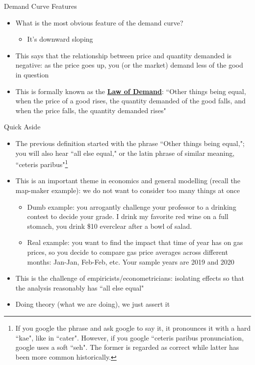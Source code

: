 \documentclass[10pt,xcolor={svgnames}]{beamer}
\begin{document}
\begin{frame}{Demand Curve Features}
    \begin{itemize}[<+->]
        \item What is the most obvious feature of the demand curve? 
        \begin{itemize}
            \item It's downward sloping
        \end{itemize}
        \item This says that the relationship between price and quantity demanded is negative: as the price goes up, you (or the market) demand less of the good in question
        \item This is formally known as the \underline{\textbf{Law of Demand}}: ``Other things being equal, when the price of a good rises, the quantity demanded of the good falls, and when the price falls, the quantity demanded rises"
    \end{itemize}
\end{frame}

\begin{frame}{Quick Aside}
    \begin{itemize}[<+->]
        \item The previous definition started with the phrase ``Other things being equal,"; you will also hear ``all else equal," or the latin phrase of similar meaning, ``ceteris paribus"\footnote{If you google the phrase and ask google to say it, it pronounces it with a hard ``kae", like in ``cater". However, if you google ``ceteris paribus pronunciation, google uses a soft ``seh". The former is regarded as correct while latter has been more common historically.\vspace{2mm}}
        \item This is an important theme in economics and general modelling (recall the map-maker example): we do not want to consider too many things at once
        \begin{itemize}
            \item Dumb example: you arrogantly challenge your professor to a drinking contest to decide your grade. I drink my favorite red wine on a full stomach, you drink \$10 everclear after a bowl of salad. 
            \item Real example: you want to find the impact that time of year has on gas prices, so you decide to compare gas price averages across different months: Jan-Jan, Feb-Feb, etc. Your sample years are 2019 and 2020
        \end{itemize}
        \item This is the challenge of empiricists/econometricians: isolating effects so that the analysis reasonably has ``all else equal"
        \item Doing theory (what we are doing), we just assert it\vspace{1mm}
    \end{itemize}
\end{frame}
\end{document}
